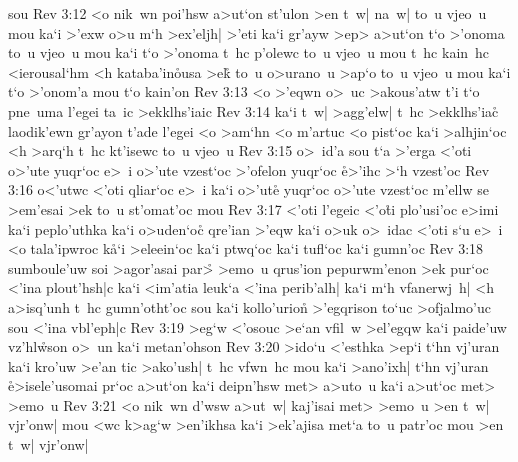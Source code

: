 sou\bibvsend
\vs Rev 3:12
<o
nik~wn
poi'hsw
a>ut`on
st'ulon
>en
t~w|
na~w|
to~u
vjeo~u
mou
ka`i
>'exw
o>u
m`h
>ex'eljh|
>'eti
ka`i
gr'ayw
>ep>
a>ut`on
t`o
>'onoma
to~u
vjeo~u
mou
ka`i
t`o
>'onoma
t~hc
p'olewc
to~u
vjeo~u
mou
t~hc
kain~hc
<ierousal`hm
<h
kataba'in\r{o}usa
>e\r{k}
to~u
o>urano~u
>ap`o
to~u
vjeo~u
mou
ka`i
t`o
>'onom'a
mou
t`o
kain'on\bibvsend
\vs Rev 3:13
<o
>'eqwn
o>~uc
>akous'atw
t'i
t`o
pne~uma
l'egei
ta~ic
>ekklhs'iaic\bibvsend
\vs Rev 3:14
ka`i
t~w|
>agg'elw|
t~hc
>ekklhs'iac\r{}
laodik'ewn
gr'ayon
t'ade
l'egei
<o
>am`hn
<o
m'artuc
<o
pist`oc
ka`i
>alhjin`oc
<h
>arq`h
t~hc
kt'isewc
to~u
vjeo~u\bibvsend
\vs Rev 3:15
o>~id'a
sou
t`a
>'erga
<'oti
o>'ute
yuqr`oc
e>~i
o>'ute
vzest`oc
>'ofelon
yuqr`oc
\r{e}>'ihc
>`h
vzest'oc\bibvsend
\vs Rev 3:16
o<'utwc
<'oti
qliar`oc
e>~i
ka`i
o>'ute\r{}
yuqr`oc
o>'ute
vzest`oc
m'ellw
se
>em'esai
>ek
to~u
st'omat'oc
mou\bibvsend
\vs Rev 3:17
<'oti
l'egeic
<'o\r{t}i
plo'usi'oc
e>imi
ka`i
peplo'uthka
ka`i
o>uden`o\r{c}
qre'ian
>'eqw
ka`i
o>uk
o>~idac
<'oti
s`u
e>~i
<o
tala'ipwroc
k\r{a}`i
>eleein`oc
ka`i
ptwq`oc
ka`i
tufl`oc
ka`i
gumn'oc\bibvsend
\vs Rev 3:18
sumboule'uw
soi
>agor'asai
par>\r{}
>emo~u
qrus'ion
pepurwm'enon
>ek
pur`oc
<'ina
plout'hsh|c
ka`i
<im'atia
leuk`a
<'ina
perib'alh|
ka`i
m`h
vfanerwj~h|
<h
a>isq'unh
t~hc
gumn'otht'oc
sou
ka`i
kollo'urion\r{}
>'egqrison
to`uc
>ofjalmo'uc
sou
<'ina
vbl'eph|c\bibvsend
\vs Rev 3:19
>eg`w
<'osouc
>e`an
vfil~w
>el'egqw
ka`i
paide'uw
vz'hl\r{w}son
o>~un
ka`i
metan'ohson\bibvsend
\vs Rev 3:20
>ido`u
<'esthka
>ep`i
t`hn
vj'uran
ka`i
kro'uw
>e'an
tic
>ako'ush|
t~hc
vfwn~hc
mou
ka`i
>ano'ixh|
t`hn
vj'uran
\r{e}>isele'usomai
pr`oc
a>ut`on
ka`i
deipn'hsw
met>
a>uto~u
ka`i
a>ut`oc
met>
>emo~u\bibvsend
\vs Rev 3:21
<o
nik~wn
d'wsw
a>ut~w|
kaj'isai
met>
>emo~u
>en
t~w|
vjr'onw|
mou
<wc
k>ag`w
>en'ikhsa
ka`i
>ek'ajisa
met`a
to~u
patr'oc
mou
>en
t~w|
vjr'onw|
